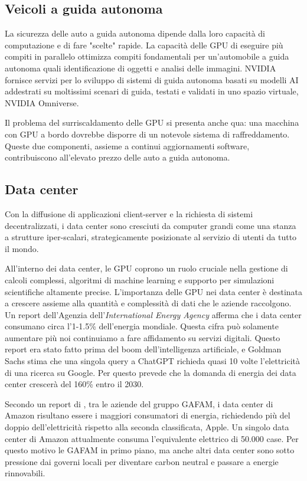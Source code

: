 \documentclass[12pt,a4paper,oneside]{book}
\begin{document}
\subsection{Veicoli a guida autonoma}

La sicurezza delle auto a guida autonoma dipende dalla loro capacità di computazione e di fare "scelte" rapide. La capacità delle GPU di eseguire più compiti in parallelo ottimizza compiti fondamentali per un'automobile a guida autonoma quali identificazione di oggetti e analisi delle immagini. NVIDIA fornisce servizi per lo sviluppo di sistemi di guida autonoma basati su modelli AI addestrati su moltissimi scenari di guida, testati e validati in uno spazio virtuale, NVIDIA Omniverse.

Il problema del surriscaldamento delle GPU si presenta anche qua: una macchina con GPU a bordo dovrebbe disporre di un notevole sistema di raffreddamento. Queste due componenti, assieme a continui aggiornamenti software, contribuiscono all'elevato prezzo delle auto a guida autonoma.

\subsection{Data center}

Con la diffusione di applicazioni client-server e la richiesta di sistemi decentralizzati, i data center sono cresciuti da computer grandi come una stanza a strutture iper-scalari, strategicamente posizionate al servizio di utenti da tutto il mondo. 

All'interno dei data center, le GPU coprono un ruolo cruciale nella gestione di calcoli complessi, algoritmi di machine learning e supporto per simulazioni scientifiche altamente precise. L'importanza delle GPU nei data center è destinata a crescere assieme alla quantità e complessità di dati che le aziende raccolgono. Un report dell'Agenzia dell'\textit{International Energy Agency} afferma che i data center consumano circa l'1-1.5\% dell'energia mondiale. Questa cifra può solamente aumentare più noi continuiamo a fare affidamento su servizi digitali. Questo report era stato fatto prima del boom dell'intelligenza artificiale, e Goldman Sachs stima che una singola query a ChatGPT richieda quasi 10 volte l'elettricità di una ricerca su Google. Per questo prevede che la domanda di energia dei data center crescerà del 160\% entro il 2030.

Secondo un report di \cite{guardian2024datacenters}, tra le aziende del gruppo GAFAM, i data center di Amazon risultano essere i maggiori consumatori di energia, richiedendo più del doppio dell'elettricità rispetto alla seconda classificata, Apple. Un singolo data center di Amazon attualmente consuma l'equivalente elettrico di 50.000 case. Per questo motivo le GAFAM in primo piano, ma anche altri data center sono sotto pressione dai governi locali per diventare carbon neutral e passare a energie rinnovabili.
\end{document}
